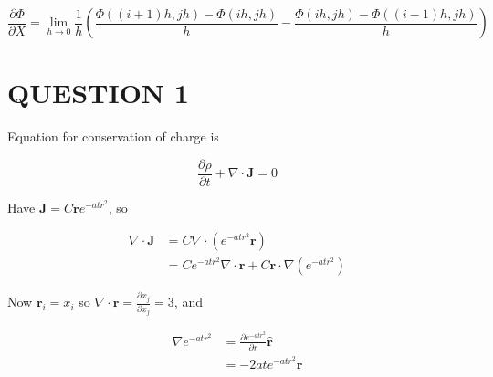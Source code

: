 \documentclass[a4paper]{article}
\begin{document}
	
	
	\[ \frac{\partial \Phi }{\partial X} = \lim\limits_{h \to 0}  \frac{1}{h}   \left(   \frac{\Phi( (i+1)h,jh ) - \Phi(ih,jh) }{h}  - \frac{\Phi( ih,jh ) - \Phi((i-1)h,jh) }{h}  \right) \]
	
	
	
	
	
\maketitle







\section{QUESTION 1}

Equation for conservation of charge is

\[ \frac{\partial \rho }{\partial t}  + \nabla \cdot \mathbf{J} = 0 \]

Have $  \mathbf{J} = C \mathbf{r} e^{-atr^{2}} $, so 

\begin{align*}
\nabla \cdot \mathbf{J} & = C \nabla \cdot (e^{-atr^{2}} \mathbf{r} )   \\
& = C e^{-atr^{2}} \nabla \cdot \mathbf{r} + C \mathbf{r} \cdot \nabla (e^{-atr^{2}})
\end{align*}

Now $ \mathbf{r}_{i} = x_{i} $ so $ \nabla \cdot \mathbf{r} = \frac{\partial x_{j}}{\partial x_{j}} = 3 $, and 


\begin{align*}                                         
 \nabla e^{-atr^{2}} & = \frac{\partial e^{-atr^{2}} }{\partial r} \hat{\mathbf{r}} \\
& = - 2ate^{-atr^{2}} \mathbf{r}
\end{align*}
                                                       
\end{document}

